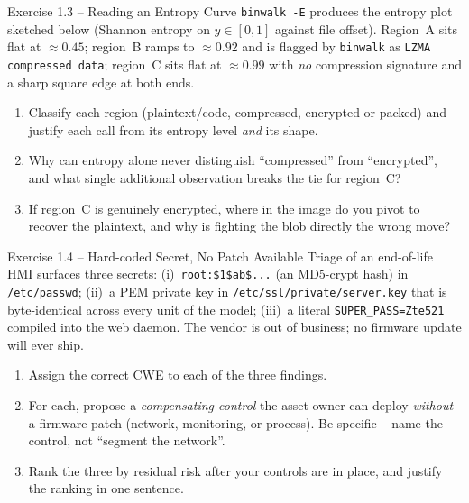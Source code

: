 \documentclass[11pt,a4paper]{article}
\begin{document}
\begin{taskbox}{Exercise 1.3 -- Reading an Entropy Curve}
\texttt{binwalk -E} produces the entropy plot sketched below (Shannon entropy on $y\in[0,1]$
against file offset). Region~A sits flat at $\approx 0.45$; region~B ramps to $\approx 0.92$
and is flagged by \texttt{binwalk} as \texttt{LZMA compressed data}; region~C sits flat at
$\approx 0.99$ with \emph{no} compression signature and a sharp square edge at both ends.
\begin{center}
\end{center}
\begin{enumerate}\setlength{\itemsep}{0pt}
  \item Classify each region (plaintext/code, compressed, encrypted or packed) and justify
        each call from its entropy level \emph{and} its shape.
  \item Why can entropy alone never distinguish ``compressed'' from ``encrypted'', and what
        single additional observation breaks the tie for region~C?
  \item If region~C is genuinely encrypted, where in the image do you pivot to recover the
        plaintext, and why is fighting the blob directly the wrong move?
\end{enumerate}
\end{taskbox}

\begin{taskbox}{Exercise 1.4 -- Hard-coded Secret, No Patch Available}
Triage of an end-of-life HMI surfaces three secrets: (i)~\texttt{root:\$1\$ab\$...} (an MD5-crypt
hash) in \texttt{/etc/passwd}; (ii)~a PEM private key in \texttt{/etc/ssl/private/server.key}
that is byte-identical across every unit of the model; (iii)~a literal
\texttt{SUPER\_PASS=Zte521} compiled into the web daemon. The vendor is out of business; no
firmware update will ever ship.
\begin{enumerate}\setlength{\itemsep}{0pt}
  \item Assign the correct CWE to each of the three findings.
  \item For each, propose a \emph{compensating control} the asset owner can deploy
        \emph{without} a firmware patch (network, monitoring, or process). Be specific -- name
        the control, not ``segment the network''.
  \item Rank the three by residual risk after your controls are in place, and justify the
        ranking in one sentence.
\end{enumerate}
\end{taskbox}
\end{document}
